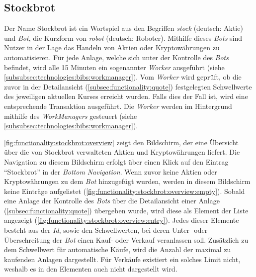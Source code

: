 \documentclass[a4paper]{article}
\begin{document}
\subsection{Stockbrot}
\label{subsec:functionality:stockbrot}
Der Name Stockbrot ist ein Wortspiel aus den Begriffen \textit{stock} (deutsch: Aktie) und \textit{Bot}, die Kurzform von \textit{robot} (deutsch: Roboter).
Mithilfe dieses \textit{Bots} sind Nutzer in der Lage das Handeln von Aktien oder Kryptowährungen zu automatisieren.
Für jede Anlage, welche sich unter der Kontrolle des \textit{Bots} befindet, wird alle 15 Minuten ein sogenannter \textit{Worker} ausgeführt (siehe \autoref{subsubsec:technologies:bibs:workmanager}).
Vom \textit{Worker} wird geprüft, ob die zuvor in der Detailansicht (\autoref{subsec:functionality:quote}) festgelegten Schwellwerte des jeweiligen aktuellen Kurses erreicht wurden.
Falls dies der Fall ist, wird eine entsprechende Transaktion ausgeführt.
Die \textit{Worker} werden im Hintergrund mithilfe des \textit{WorkManagers} gesteuert (siehe \autoref{subsubsec:technologies:bibs:workmanager}).

\autoref{fig:functionality:stockbrot:overview} zeigt den Bildschirm, der eine Übersicht über die von Stockbrot verwalteten Aktien und Kryptowährungen liefert.
Die Navigation zu diesem Bildschirm erfolgt über einen Klick auf den Eintrag "`Stockbrot"' in der \textit{Bottom Navigation}.
Wenn zuvor keine Aktien oder Kryptowährungen zu dem \textit{Bot} hinzugefügt wurden, werden in diesem Bildschirm keine Einträge aufgelistet (\autoref{fig:functionality:stockbrot:overview:empty}).
Sobald eine Anlage der Kontrolle des \textit{Bots} über die Detailansicht einer Anlage (\autoref{subsec:functionality:quote}) übergeben wurde, wird diese als Element der Liste angezeigt (\autoref{fig:functionality:stockbrot:overview:entry}).
Jedes dieser Elemente besteht aus der \textit{Id}, sowie den Schwellwerten, bei deren Unter- oder Überschreitung der \textit{Bot} einen Kauf- oder Verkauf veranlassen soll.
Zusätzlich zu dem Schwellwert für automatische Käufe, wird die Anzahl der maximal zu kaufenden Anlagen dargestellt.
Für Verkäufe existiert ein solches Limit nicht, weshalb es in den Elementen auch nicht dargestellt wird.
\end{document}
